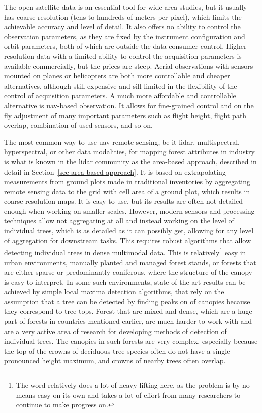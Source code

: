 The open satellite data is an essential tool for wide-area studies, but it usually has coarse resolution (tens to hundreds of meters per pixel), which limits the achievable accuracy and level of detail.
It also offers no ability to control the observation parameters, as they are fixed by the instrument configuration and orbit parameters, both of which are outside the data consumer control.
Higher resolution data with a limited ability to control the acquisition parameters is available commercially, but the prices are steep.
Aerial observations with sensors mounted on planes or helicopters are both more controllable and cheaper alternatives, although still expensive and sill limited in the flexibility of the control of acquisition parameters.
A much more affordable and controllable alternative is \gls{uav}-based observation.
It allows for fine-grained control and on the fly adjustment of many important parameters such as flight height, flight path overlap, combination of used sensors, and so on.

The most common way to use \gls{uav} remote sensing, be it \gls{lidar}, multispectral, hyperspectral, or other data modalities, for mapping forest attributes in industry is what is known in the \gls{lidar} community as the area-based approach, described in detail in Section~\ref{sec-area-based-approach}.
It is based on extrapolating measurements from ground plots made in traditional inventories by aggregating remote sensing data to the grid with cell area of a ground plot, which results in coarse resolution maps.
It is easy to use, but its results are often not detailed enough when working on smaller scales.
However, modern sensors and processing techniques allow not aggregating at all and instead working on the level of individual trees, which is as detailed as it can possibly get, allowing for any level of aggregation for downstream tasks.
This requires robust algorithms that allow detecting individual trees in dense multimodal data.
This is relatively\footnote{The word relatively does a lot of heavy lifting here, as the problem is by no means easy on its own and takes a lot of effort from many researchers to continue to make progress on.
} easy in urban environments, manually planted and managed forest stands, or forests that are either sparse or predominantly coniferous, where the structure of the canopy is easy to interpret.
In some such environments, state-of-the-art results can be achieved by simple local maxima detection algorithms, that rely on the assumption that a tree can be detected by finding peaks on of canopies because they correspond to tree tops.
Forest that are mixed and dense, which are a huge part of forests in countries mentioned earlier, are much harder to work with and are a very active area of research for developing methods of detection of individual trees.
The canopies in such forests are very complex, especially because the top of the crowns of deciduous tree species often do not have a single pronounced height maximum, and crowns of nearby trees often overlap.

